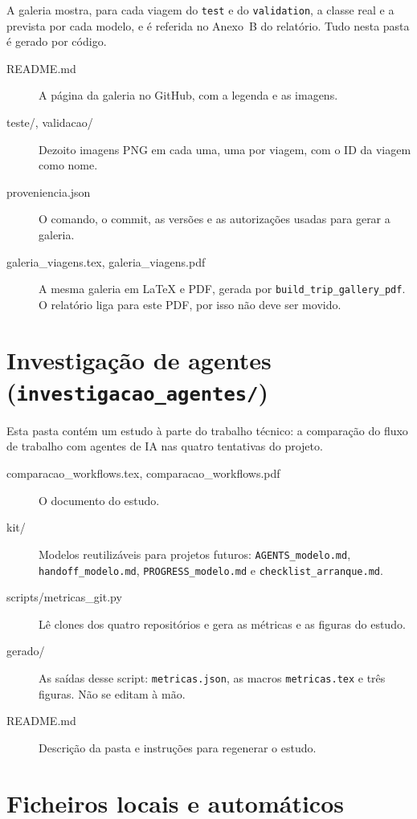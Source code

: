 \documentclass[11pt,a4paper]{article}
\newcommand{\f}[1]{\texttt{#1}}
\begin{document}
A galeria mostra, para cada viagem do \f{test} e do \f{validation}, a classe real e a prevista por
cada modelo, e é referida no Anexo~B do relatório. Tudo nesta pasta é gerado por código.

\begin{description}
\item[README.md] A página da galeria no GitHub, com a legenda e as imagens.
\item[teste/, validacao/] Dezoito imagens PNG em cada uma, uma por viagem, com o ID da viagem
  como nome.
\item[proveniencia.json] O comando, o commit, as versões e as autorizações usadas para gerar a
  galeria.
\item[galeria\_viagens.tex, galeria\_viagens.pdf] A mesma galeria em LaTeX e PDF, gerada por
  \f{build\_trip\_gallery\_pdf}. O relatório liga para este PDF, por isso não deve ser movido.
\end{description}

\section{Investigação de agentes (\f{investigacao\_agentes/})}\label{sec:investigacao}

Esta pasta contém um estudo à parte do trabalho técnico: a comparação do fluxo de trabalho com
agentes de IA nas quatro tentativas do projeto.

\begin{description}
\item[comparacao\_workflows.tex, comparacao\_workflows.pdf] O documento do estudo.
\item[kit/] Modelos reutilizáveis para projetos futuros: \f{AGENTS\_modelo.md},
  \f{handoff\_modelo.md}, \f{PROGRESS\_modelo.md} e \f{checklist\_arranque.md}.
\item[scripts/metricas\_git.py] Lê clones dos quatro repositórios e gera as métricas e as
  figuras do estudo.
\item[gerado/] As saídas desse script: \f{metricas.json}, as macros \f{metricas.tex} e três
  figuras. Não se editam à mão.
\item[README.md] Descrição da pasta e instruções para regenerar o estudo.
\end{description}

\section{Ficheiros locais e automáticos}\label{sec:locais}
\end{document}
